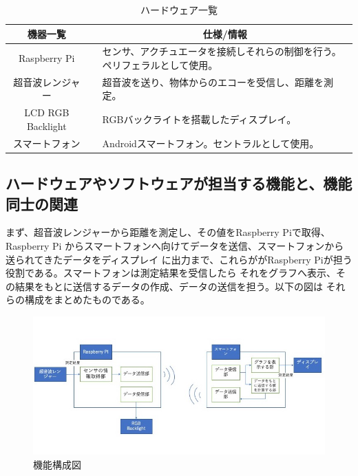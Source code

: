 \documentclass[dvipdfmx,autodetect-engine,titlepage]{jsarticle}
\begin{document}
 \begin{table}[h]
    \caption{ハードウェア一覧}
    \begin{tabular}{cll}
    \hline
    機器一覧              & \multicolumn{1}{c}{} & \multicolumn{1}{c}{仕様/情報}             \\ \hline\hline
    Raspberry Pi      &                      & センサ、アクチュエータを接続しそれらの制御を行う。ペリフェラルとして使用。 \\ \hline
    超音波レンジャー          &                      & 超音波を送り、物体からのエコーを受信し、距離を測定。            \\ \hline
    LCD RGB Backlight &                      & RGBバックライトを搭載したディスプレイ。                 \\ \hline
    スマートフォン           &                      & Androidスマートフォン。セントラルとして使用。            \\ \hline
    \end{tabular}
    \end{table}

 
 \subsection{ハードウェアやソフトウェアが担当する機能と、機能同士の関連}
 まず、超音波レンジャーから距離を測定し、その値をRaspberry Piで取得、Raspberry Pi
 からスマートフォンへ向けてデータを送信、スマートフォンから送られてきたデータをディスプレイ
 に出力まで、これらががRaspberry Piが担う役割である。スマートフォンは測定結果を受信したら
 それをグラフへ表示、その結果をもとに送信するデータの作成、データの送信を担う。以下の図は
 それらの構成をまとめたものである。

 \begin{figure}[h]
    \centering
    \includegraphics[scale=0.6]{pic2.jpg}
    \caption{機能構成図}
  \end{figure}
\end{document}

